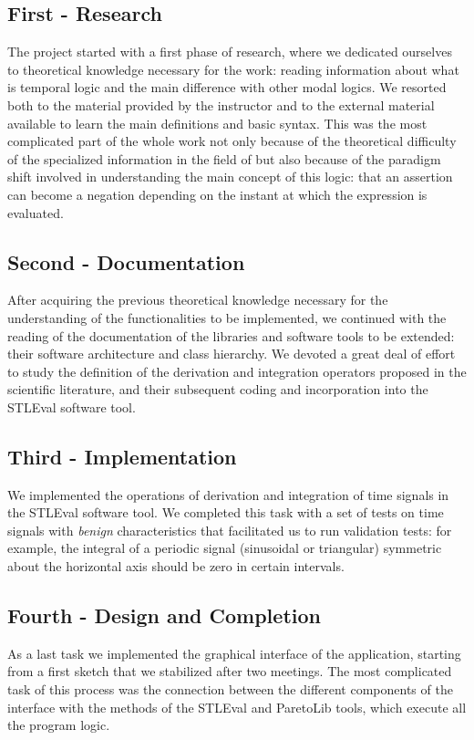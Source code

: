 \subsection{First - Research}
The project started with a first phase of research, where we dedicated ourselves to theoretical knowledge necessary for the work: reading information about what is temporal logic and the main difference with other modal logics.
We resorted both to the material provided by the instructor and to the external material available to learn the main definitions and basic syntax.
This was the most complicated part of the whole work not only because of the theoretical difficulty of the specialized information in the field of 
but also because of the paradigm shift involved in understanding the main concept of this logic: that an assertion can become a negation depending on the instant at which the expression is evaluated.


\subsection{Second - Documentation}
After acquiring the previous theoretical knowledge necessary for the understanding of the functionalities to be implemented, we continued with the reading of the documentation of the libraries and software tools to be extended: their software architecture and class hierarchy. We devoted a great deal of effort to study the definition of the derivation and integration operators proposed in the scientific literature, and their subsequent coding and incorporation into the STLEval software tool.

\subsection{Third - Implementation}
We implemented the operations of derivation and integration of time signals in the STLEval software tool. We completed this task with a set of tests on time signals with \textit{benign} characteristics that facilitated us to run validation tests: for example, the integral of a periodic signal (sinusoidal or triangular) symmetric about the horizontal axis should be zero in  certain intervals.

\subsection{Fourth - Design and Completion}
As a last task we implemented the graphical interface of the application, starting from a first sketch that we stabilized after two meetings. The most complicated task of this process was the connection between the different components of the interface with the methods of the STLEval and ParetoLib tools, which execute all the program logic.

